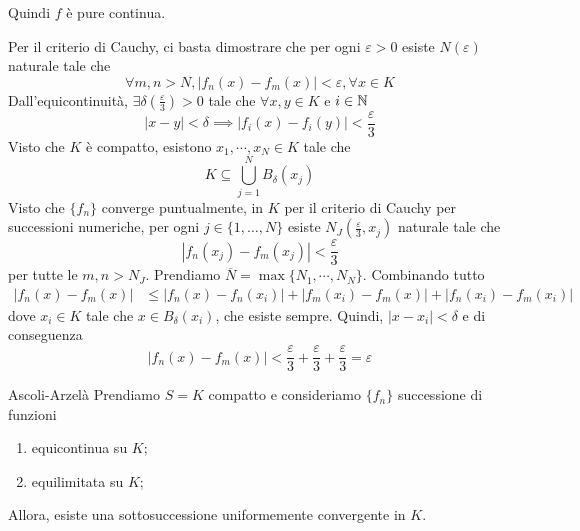 \documentclass[a4paper]{article}
\begin{document}
\begin{radioactive}
Quindi \(f\) è pure continua.
\end{radioactive}

\begin{radioactive}
\begin{snippetproof}{}
    Per il criterio di Cauchy,
    ci basta dimostrare che per ogni \(\varepsilon > 0\) esiste \(N(\varepsilon)\) naturale tale che
    \[
        \forall m,n > N,
        |f_n(x) - f_m(x)| < \varepsilon, \forall x \in K
    \]
    Dall'equicontinuità, \(\exists \delta\left(\frac{\varepsilon}{3}\right) > 0\)
    tale che \(\forall x,y \in K\) e \(i \in \mathbb{N}\)
    \[
        |x-y|<\delta \implies
        |f_i(x)-f_i(y)|<\frac{\varepsilon}{3}
    \]
    Visto che \(K\) è compatto, esistono \(x_1, \cdots, x_N \in K\)
    tale che
    \[
        K \subseteq \bigcup_{j=1}^N B_\delta(x_j)
    \]
    Visto che \(\{f_n\}\) converge puntualmente, in \(K\)
    per il criterio di Cauchy per successioni numeriche,
    per ogni \(j\in\{1,\ldots,N\}\) esiste \(N_J\left(\frac{\varepsilon}{3}, x_j\right)\)
    naturale tale che
    \[
        |f_n(x_j) - f_m(x_j)| < \frac{\varepsilon}{3}
    \]
    per tutte le \(m,n > N_J\).
    Prendiamo \(\overline N = \max \{N_1, \cdots, N_N\}\).
    Combinando tutto
    \begin{align*}
        |f_n(x) - f_m(x)| &\leq |f_n(x) - f_n(x_i)| + |f_m(x_i) - f_m(x)|
        + |f_n(x_i) - f_m(x_i)|
    \end{align*}
    dove \(x_i \in K\) tale che \(x \in B_\delta(x_i)\), che esiste sempre.
    Quindi, \(|x-x_i| < \delta \) e di conseguenza
    \[
        |f_n(x) - f_m(x)| < \frac{\varepsilon}{3} + \frac{\varepsilon}{3} + \frac{\varepsilon}{3} = \varepsilon
    \]
\end{snippetproof}
\end{radioactive}

\begin{radioactive}
\begin{snippettheorem}{Ascoli-Arzelà}
    Prendiamo \(S=K\) compatto e consideriamo
    \(\{f_n\}\) successione di funzioni
    \begin{enumerate}
        \item equicontinua su \(K\);
        \item equilimitata su \(K\);
    \end{enumerate}
    Allora, esiste una sottosuccessione uniformemente convergente in \(K\).
\end{snippettheorem}
\end{radioactive}
\end{document}
